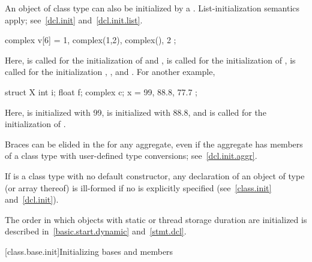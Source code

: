 \pnum
{}%
%
An object of class type can also be initialized by a
. List-initialization semantics apply;
see~\ref{dcl.init} and~\ref{dcl.init.list}. \begin{example}

\begin{codeblock}
complex v[6] = { 1, complex(1,2), complex(), 2 };
\end{codeblock}

Here,
is called for the initialization of
and
,
is called for the initialization of
,
is called for the initialization
,
,
and
.
For another example,

\begin{codeblock}
struct X {
  int i;
  float f;
  complex c;
} x = { 99, 88.8, 77.7 };
\end{codeblock}

Here,
is initialized with 99,
is initialized with 88.8, and
is called for the initialization of
.
\end{example}
\begin{note}
Braces can be elided in the
for any aggregate, even if the aggregate has members of a class type with
user-defined type conversions; see~\ref{dcl.init.aggr}.
\end{note}

\pnum
\begin{note}
If
is a class type with no default constructor,
any declaration of an object of type
(or array thereof) is ill-formed if no
is explicitly specified (see~\ref{class.init} and~\ref{dcl.init}).
\end{note}

\pnum
\begin{note}
%
The order in which objects with static or thread storage duration
are initialized is described in~\ref{basic.start.dynamic} and~\ref{stmt.dcl}.
\end{note}

[class.base.init]{Initializing bases and members}%
%

